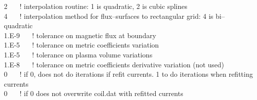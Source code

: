 2    $\:\:\:\:\:$      ! interpolation routine: 1 is quadratic, 2 is cubic splines\\
4			  $\:\:\:\:\:$   			! interpolation method for flux--surfaces to rectangular grid: 4 is bi--quadratic\\
1.E-9    $\:\:\:\:\:$     ! tolerance on magnetic flux at boundary\\
1.E-5   $\:\:\:\:\:$      ! tolerance on metric coefficients variation\\
1.E-5    $\:\:\:\:\:$      ! tolerance on plasma volume variations\\
1.E-8 	  $\:\:\:\:\:$   		! tolerance on metric coefficients derivative variation (not used)\\					
0 	  $\:\:\:\:\:$   		! if 0, does not do iterations if refit currents. 1 to do iterations when refitting currents \\					
0 	  $\:\:\:\:\:$   		! if 0 does not overwrite coil.dat with refitted currents\\					

%



%
